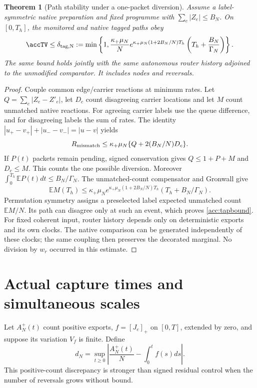 \documentclass[11pt,oneside,openany]{book}
\newtheorem{theorem}{Theorem}[chapter]
\theoremstyle{definition}
\theoremstyle{remark}\newtheorem{remark}[theorem]{Remark}
\begin{document}
\begin{theorem}[Path stability under a one-packet diversion]\label{acc:tapstability}
Assume a label-symmetric native preparation and fixed programme with
$\sum_e|Z_e|\le B_N$. On $[0,T_h]$, the monitored and native tagged paths
obey
\begin{equation}
 \accTV\le\delta_{\rm tag,N}:=
 \min\left\{1,\frac{\kappa_+\mu_N}{N}
 e^{\kappa_+\mu_N(1+2B_N/N)T_h}
 \left(T_h+\frac{B_N}{\Gamma_N}\right)\right\}.
 \label{acc:tapbound}
\end{equation}
The same bound holds jointly with the same autonomous router history
adjoined to the unmodified comparator. It includes nodes and reversals.
\end{theorem}
\begin{proof}
Couple common edge/carrier reactions at minimum rates. Let
$Q=\sum_e|Z_e-Z'_e|$, let $D_c$ count disagreeing carrier locations and
let $M$ count unmatched native reactions. For agreeing carrier labels use
the queue difference, and for disagreeing labels the sum of rates. The
identity $|u_+-v_+|+|u_--v_-|=|u-v|$ yields
\[
 R_{
\rm mismatch}\le\kappa_+\mu_N\{Q+2(B_N/N)D_c\}.
\]
If $P(t)$ packets remain pending, signed conservation gives
$Q\le1+P+M$ and $D_c\le M$. This counts the one possible diversion.
Moreover $\int_0^{T_h}\mathbb EP(t)dt\le B_N/\Gamma_N$.
The unmatched-count compensator and Gronwall give
\[
 \mathbb EM(T_h)\le\kappa_+\mu_N
 e^{\kappa_+\mu_N(1+2B_N/N)T_h}(T_h+B_N/\Gamma_N).
\]
Permutation symmetry assigns a preselected label expected unmatched
count $\mathbb EM/N$. Its path can disagree only at such an event,
which proves \eqref{acc:tapbound}. For fixed coherent input, router
history depends only on deterministic exports and its own clocks.
The native comparison can be generated independently of these clocks;
the same coupling then preserves the decorated marginal. No division by
$w_r$ occurred in this estimate.
\end{proof}

\section{Actual capture times and simultaneous scales}
Let $A_N^+(t)$ count positive exports, $f=[J_e]_+$ on $[0,T]$, extended
by zero, and suppose its variation $V_f$ is finite. Define
\[
 d_N=\sup_{t\ge0}\left|\frac{A_N^+(t)}N-\int_0^tf(s)ds\right|.
\]
This positive-count discrepancy is stronger than signed residual control
when the number of reversals grows without bound.
\end{document}
